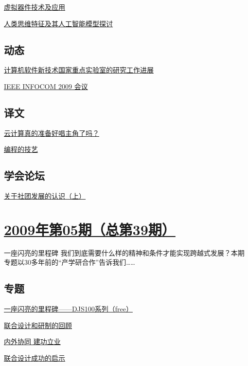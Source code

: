 \documentclass[a4paper]{article}
\begin{document}
\href{http://history.ccf.org.cn/resources/1190201776262/2010/04/15/040057.pdf}{虚拟器件技术及应用}

\href{http://history.ccf.org.cn/resources/1190201776262/2010/04/15/040062.pdf}{人类思维特征及其人工智能模型探讨}

\subsection{动态}
\href{http://history.ccf.org.cn/resources/1190201776262/2010/04/15/040066.pdf}{计算机软件新技术国家重点实验室的研究工作进展}

\href{http://history.ccf.org.cn/resources/1190201776262/2010/04/15/040070.pdf}{IEEE INFOCOM 2009 会议}

\subsection{译文}
\href{http://history.ccf.org.cn/resources/1190201776262/2010/04/15/040072.pdf}{云计算真的准备好唱主角了吗？}

\href{http://history.ccf.org.cn/resources/1190201776262/2010/04/15/040078.pdf}{编程的技艺}

\subsection{学会论坛}
\href{http://history.ccf.org.cn/resources/1190201776262/2010/04/15/040092.pdf}{关于社团发展的认识（上）}


\section{\href{http://history.ccf.org.cn/sites/ccf/jsjtbbd.jsp?contentId=2542567629034}{\textbf{2009年第05期（总第39期）}}}
一座闪亮的里程碑 我们到底需要什么样的精神和条件才能实现跨越式发展？本期专题以30多年前的“产学研合作”告诉我们……
\subsection{专题}
\href{http://history.ccf.org.cn/resources/1190201776262/2010/04/15/039006.pdf}{一座闪亮的里程碑——DJS100系列（free）}

\href{http://history.ccf.org.cn/resources/1190201776262/2010/04/15/039008.pdf}{联合设计和研制的回顾}

\href{http://history.ccf.org.cn/resources/1190201776262/2010/04/15/039014.pdf}{内外协同 建功立业}

\href{http://history.ccf.org.cn/resources/1190201776262/2010/04/15/039016.pdf}{联合设计成功的启示}
\end{document}
